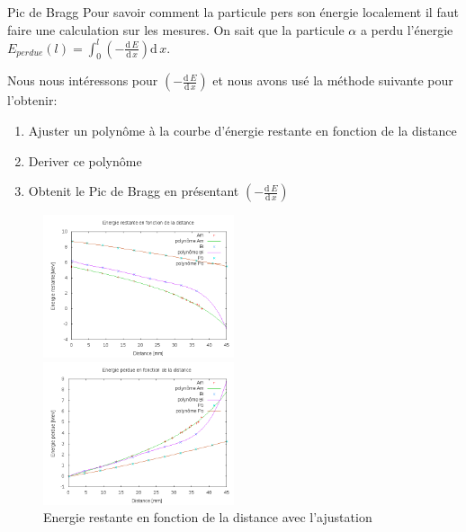 \documentclass[a4paper,11pt,liststotocnumbered,bibtotocnumbered]{scrartcl}
\begin{document}
 \begin{section}{Pic de Bragg}
  Pour savoir comment la particule pers son énergie localement il faut faire une calculation sur les mesures. On sait que la particule $\alpha$ a perdu l'énergie $E_{perdue}(l)=\int_0^l \left(-\frac{\text{d}\,E}{\text{d}\,x}\right) \text{d}\,x$.

  Nous nous intéressons pour $\left(-\frac{\text{d}\,E}{\text{d}\,x}\right)$ et nous avons usé la méthode suivante pour l'obtenir:
  \begin{enumerate}
   \item Ajuster un polynôme à la courbe d'énergie restante en fonction de la distance
   \item Deriver ce polynôme
   \item Obtenit le Pic de Bragg en présentant $\left(-\frac{\text{d}\,E}{\text{d}\,x}\right)$ 
  \end{enumerate}
  \begin{figure}[hbt]
   \begin{minipage}{0.45\textwidth}
    \begin{center}
    \includegraphics[width=0.5\textwidth]{Sabine/fit_alle.png}
    \caption{Energie restante en fonction de la distance avec l'ajustation}
    \end{center} 
   \end{minipage}
   \hfill
   \begin{minipage}{0.45\textwidth}
    \begin{center}
    \includegraphics[width=0.5\textwidth]{Sabine/fit_alle_perte.png}

\end{center}
\end{minipage}
\end{figure}
\end{section}
\end{document}
